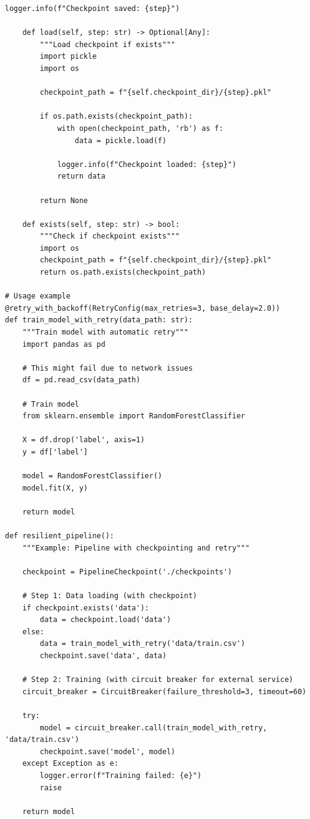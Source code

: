 \begin{lstlisting}[style=python, caption=Production-Grade Failure Handling]
        logger.info(f"Checkpoint saved: {step}")

    def load(self, step: str) -> Optional[Any]:
        """Load checkpoint if exists"""
        import pickle
        import os

        checkpoint_path = f"{self.checkpoint_dir}/{step}.pkl"

        if os.path.exists(checkpoint_path):
            with open(checkpoint_path, 'rb') as f:
                data = pickle.load(f)

            logger.info(f"Checkpoint loaded: {step}")
            return data

        return None

    def exists(self, step: str) -> bool:
        """Check if checkpoint exists"""
        import os
        checkpoint_path = f"{self.checkpoint_dir}/{step}.pkl"
        return os.path.exists(checkpoint_path)

# Usage example
@retry_with_backoff(RetryConfig(max_retries=3, base_delay=2.0))
def train_model_with_retry(data_path: str):
    """Train model with automatic retry"""
    import pandas as pd

    # This might fail due to network issues
    df = pd.read_csv(data_path)

    # Train model
    from sklearn.ensemble import RandomForestClassifier

    X = df.drop('label', axis=1)
    y = df['label']

    model = RandomForestClassifier()
    model.fit(X, y)

    return model

def resilient_pipeline():
    """Example: Pipeline with checkpointing and retry"""

    checkpoint = PipelineCheckpoint('./checkpoints')

    # Step 1: Data loading (with checkpoint)
    if checkpoint.exists('data'):
        data = checkpoint.load('data')
    else:
        data = train_model_with_retry('data/train.csv')
        checkpoint.save('data', data)

    # Step 2: Training (with circuit breaker for external service)
    circuit_breaker = CircuitBreaker(failure_threshold=3, timeout=60)

    try:
        model = circuit_breaker.call(train_model_with_retry, 'data/train.csv')
        checkpoint.save('model', model)
    except Exception as e:
        logger.error(f"Training failed: {e}")
        raise

    return model
\end{lstlisting}

